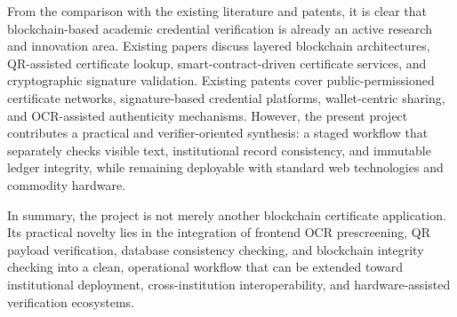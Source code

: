 \documentclass[12pt,a4paper]{article}
\begin{document}
From the comparison with the existing literature and patents, it is clear that blockchain-based academic credential verification is already an active research and innovation area. Existing papers discuss layered blockchain architectures, QR-assisted certificate lookup, smart-contract-driven certificate services, and cryptographic signature validation. Existing patents cover public-permissioned certificate networks, signature-based credential platforms, wallet-centric sharing, and OCR-assisted authenticity mechanisms. However, the present project contributes a practical and verifier-oriented synthesis: a staged workflow that separately checks visible text, institutional record consistency, and immutable ledger integrity, while remaining deployable with standard web technologies and commodity hardware.

In summary, the project is not merely another blockchain certificate application. Its practical novelty lies in the integration of frontend OCR prescreening, QR payload verification, database consistency checking, and blockchain integrity checking into a clean, operational workflow that can be extended toward institutional deployment, cross-institution interoperability, and hardware-assisted verification ecosystems.
\end{document}
